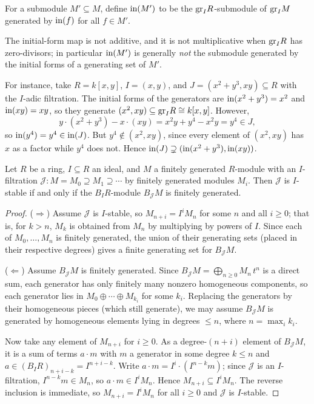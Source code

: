 \documentclass[11pt]{article}
\begin{document}
\begin{definition}
    For a submodule $M' \subseteq M$, define $\text{in}(M')$ to be the $\text{gr}_I R$-submodule of $\text{gr}_I M$ generated by $\text{in}(f)$ for all $f \in M'$.
\end{definition}

\begin{remark}\label{rem:initials}
    The initial-form map is not additive, and it is not multiplicative when $\text{gr}_I R$ has zero-divisors; in particular $\text{in}(M')$ is generally \emph{not} the submodule generated by the initial forms of a generating set of $M'$.

    For instance, take $R = k[x,y]$, $I = (x,y)$, and $J = (x^2 + y^3, xy) \subseteq R$ with the $I$-adic filtration. The initial forms of the generators are $\text{in}(x^2 + y^3) = x^2$ and $\text{in}(xy) = xy$, so they generate $(x^2, xy) \subseteq \text{gr}_I R \cong k[x,y]$. However,
    \[y \cdot (x^2 + y^3) - x \cdot (xy) = x^2y + y^4 - x^2y = y^4 \in J,\]
    so $\text{in}(y^4) = y^4 \in \text{in}(J)$. But $y^4 \notin (x^2, xy)$, since every element of $(x^2, xy)$ has $x$ as a factor while $y^4$ does not. Hence $\text{in}(J) \supsetneq (\text{in}(x^2 + y^3), \text{in}(xy))$.
\end{remark}

\begin{proposition}\label{prop:stable}
    Let $R$ be a ring, $I \subseteq R$ an ideal, and $M$ a finitely generated $R$-module with an $I$-filtration $\mathcal{J} : M = M_0 \supseteq M_1 \supseteq \cdots$ by finitely generated modules $M_i$. Then $\mathcal{J}$ is $I$-stable if and only if the $B_I R$-module $B_{\mathcal{J}}M$ is finitely generated.
\end{proposition}

\begin{proof}
    ($\Rightarrow$) Assume $\mathcal{J}$ is $I$-stable, so $M_{n+i} = I^i M_n$ for some $n$ and all $i \geq 0$; that is, for $k > n$, $M_k$ is obtained from $M_n$ by multiplying by powers of $I$. Since each of $M_0, \ldots, M_n$ is finitely generated, the union of their generating sets (placed in their respective degrees) gives a finite generating set for $B_{\mathcal{J}}M$.

    ($\Leftarrow$) Assume $B_{\mathcal{J}}M$ is finitely generated. Since $B_{\mathcal{J}}M = \bigoplus_{n \geq 0} M_n\,t^n$ is a direct sum, each generator has only finitely many nonzero homogeneous components, so each generator lies in $M_0 \oplus \cdots \oplus M_{k_i}$ for some $k_i$. Replacing the generators by their homogeneous pieces (which still generate), we may assume $B_{\mathcal{J}}M$ is generated by homogeneous elements lying in degrees $\leq n$, where $n = \max_i k_i$.

    Now take any element of $M_{n+i}$ for $i \geq 0$. As a degree-$(n+i)$ element of $B_{\mathcal{J}}M$, it is a sum of terms $a \cdot m$ with $m$ a generator in some degree $k \leq n$ and $a \in (B_I R)_{n+i-k} = I^{n+i-k}$. Write $a \cdot m = I^i \cdot (I^{n-k} m)$; since $\mathcal{J}$ is an $I$-filtration, $I^{n-k} m \in M_n$, so $a\cdot m \in I^i M_n$. Hence $M_{n+i} \subseteq I^i M_n$. The reverse inclusion is immediate, so $M_{n+i} = I^i M_n$ for all $i \geq 0$ and $\mathcal{J}$ is $I$-stable.
\end{proof}
\end{document}
